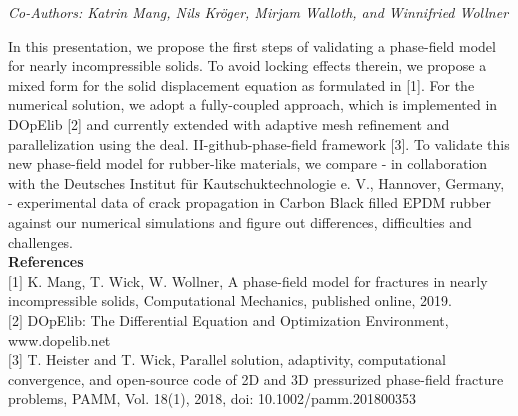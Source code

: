 \begin{center}
\textit{Co-Authors: Katrin Mang, Nils Kröger, Mirjam Walloth, and Winnifried Wollner}
\end{center} 
In this presentation, we propose the first steps of validating a phase-field model for nearly
incompressible solids. To avoid locking effects therein, we propose a mixed form for the solid
displacement equation as formulated in [1]. For the numerical solution, we adopt a fully-coupled
approach, which is implemented in DOpElib [2] and currently extended with adaptive mesh
refinement and parallelization using the deal.  II-github-phase-field framework [3]. To validate
this new phase-field model for rubber-like materials, we compare - in collaboration with the
Deutsches Institut für Kautschuktechnologie e. V., Hannover, Germany, - experimental data of
crack propagation in Carbon Black filled EPDM rubber against our numerical simulations and
figure out differences, difficulties and challenges.\\

\noindent\textbf{References}\\
$[$1$]$ K. Mang, T. Wick, W. Wollner, A phase-field model for fractures in nearly incompressible
solids, Computational Mechanics, published online, 2019.\\\newline
$[$2$]$ DOpElib: The Differential Equation and Optimization Environment,\\ www.dopelib.net\\\newline
$[3$] T. Heister and T. Wick, Parallel solution, adaptivity, computational convergence, and open-source code of 2D and 3D pressurized phase-field fracture problems, PAMM, Vol. 18(1),
2018, doi: 10.1002/pamm.201800353
